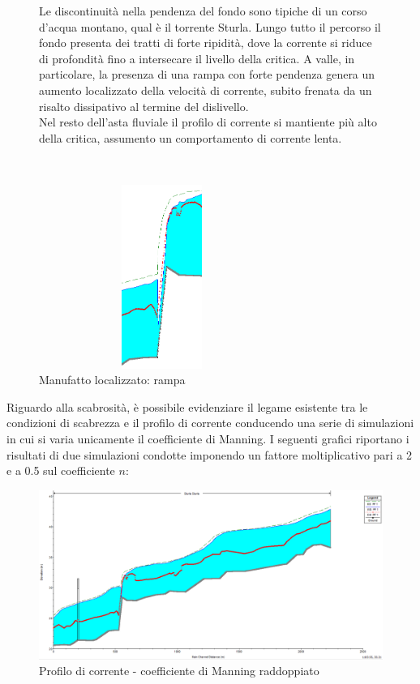 \documentclass[12pt]{article} %
\begin{document}
\begin{figure}[H]
\begin{minipage}[b]{8.5cm}
\noindent Le discontinuità nella pendenza del fondo sono tipiche di un corso d'acqua montano, qual è il torrente Sturla. Lungo tutto il percorso il fondo presenta dei tratti di forte ripidità, dove la corrente si riduce di profondità fino a intersecare il livello della critica. A valle, in particolare, la presenza di una rampa con forte pendenza genera un aumento localizzato della velocità di corrente, subito frenata da un risalto dissipativo al termine del dislivello.\\
Nel resto dell'asta fluviale il profilo di corrente si mantiente più alto della critica, assumento un comportamento di corrente lenta.

\end{minipage}
\ \hspace{2mm} \hspace{3mm} \
\begin{minipage}[b]{8.5cm}
    \centering
    \includegraphics[height=6cm, width=8cm]{Risalto.PNG}
    \caption{Manufatto localizzato: rampa}
\end{minipage}
\end{figure}

\newpage

\noindent Riguardo alla scabrosità, è possibile evidenziare il legame esistente tra le condizioni di scabrezza e il profilo di corrente conducendo una serie di simulazioni in cui si varia unicamente il coefficiente di Manning.
I seguenti grafici riportano i risultati di due simulazioni condotte imponendo un fattore moltiplicativo pari a 2 e a 0.5 sul coefficiente $n$:

\begin{figure}[H]
    \centering
    \includegraphics[scale=0.45]{Manningx2.PNG}
    \caption{Profilo di corrente - coefficiente di Manning raddoppiato}
\end{figure}
\end{document}
